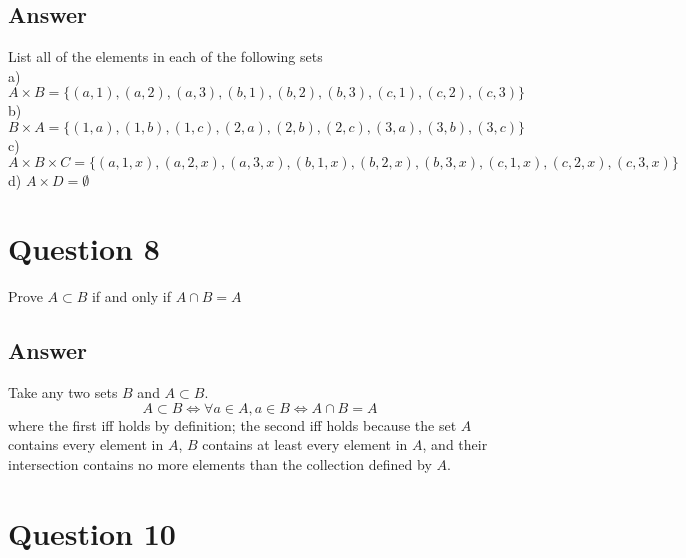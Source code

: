 \documentclass[
	12pt, %
]{fphw}
\newcommand\set[1]{\{#1\}}
\newcommand\qed{\text{$\blacksquare$}}
\begin{document}

\subsection*{Answer} List all of the elements in each of the following sets\\
a) $A \times B = \set{(a,1),(a,2),(a,3),(b,1),(b,2),(b,3),(c,1),(c,2),(c,3)}$\\
b) $B \times A = \set{(1,a),(1,b),(1,c),(2,a),(2,b),(2,c),(3,a),(3,b),(3,c)}$\\
c) $A \times B \times C=\set{(a,1,x),(a,2,x),(a,3,x),(b,1,x),(b,2,x),(b,3,x),(c,1,x),(c,2,x),(c,3,x)}$\\
d) $A \times D = \emptyset$



\section*{Question 8}

\begin{problem}
Prove $A \subset B$ if and only if $A \cap B = A$
\end{problem}


\subsection*{Answer} Take any two sets $B$ and $A \subset B$.
$$
A \subset B  \Longleftrightarrow \forall a \in A, a \in B \Longleftrightarrow A \cap B = A
$$
where the first iff holds by definition; the second iff holds because the set $A$ contains every element in $A$, $B$ contains at least every element in $A$, and their intersection contains no more elements than the collection defined by $A$.\qed


\newpage


\section*{Question 10}
\end{document}
